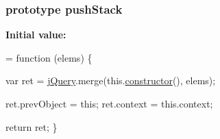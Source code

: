 \subsubsection[{\texorpdfstring{push\+Stack}{pushStack}}]{ {\bf prototype} push\+Stack}\hypertarget{jquery-2_82_81-vsdoc_8js_afc3a7db1ef2b526338c06c07cecccd44}{}\label{jquery-2_82_81-vsdoc_8js_afc3a7db1ef2b526338c06c07cecccd44}
{\bfseries Initial value\+:}
\begin{DoxyCode}
= \textcolor{keyword}{function} (elems) \{
        


        
        var ret = \hyperlink{jquery-2_82_81-vsdoc_8js_add5237586d970a38a81f990e8eb28c6c}{jQuery}.merge(this.\hyperlink{jquery-2_82_81-vsdoc_8js_ac8c7ab4467fc25f40e85c72221a1f10b}{constructor}(), elems);

        
        ret.prevObject = \textcolor{keyword}{this};
        ret.context = this.context;

        
        \textcolor{keywordflow}{return} ret;
    \}
\end{DoxyCode}
